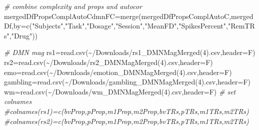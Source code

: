 \documentclass[
]{article}
\newenvironment{Shaded}{\begin{snugshade}}{\end{snugshade}}
\newcommand{\AttributeTok}[1]{\textcolor[rgb]{0.77,0.63,0.00}{#1}}
\newcommand{\CommentTok}[1]{\textcolor[rgb]{0.56,0.35,0.01}{\textit{#1}}}
\newcommand{\FunctionTok}[1]{\textcolor[rgb]{0.00,0.00,0.00}{#1}}
\newcommand{\NormalTok}[1]{#1}
\newcommand{\OtherTok}[1]{\textcolor[rgb]{0.56,0.35,0.01}{#1}}
\newcommand{\StringTok}[1]{\textcolor[rgb]{0.31,0.60,0.02}{#1}}
\begin{document}
\begin{Shaded}
\begin{Highlighting}[]
\CommentTok{\# combine complexity and props and autocor}
\NormalTok{mergedDfPropsComplAutoCdmnFC}\OtherTok{=}\FunctionTok{merge}\NormalTok{(mergedDfPropsComplAutoC,mergedDf,}\AttributeTok{by=}\FunctionTok{c}\NormalTok{(}\StringTok{"Subjects"}\NormalTok{,}\StringTok{"Task"}\NormalTok{,}\StringTok{"Dosage"}\NormalTok{,}\StringTok{"Session"}\NormalTok{,}\StringTok{"MeanFD"}\NormalTok{,}\StringTok{"SpikesPercent"}\NormalTok{,}\StringTok{"RemTRs"}\NormalTok{,}\StringTok{"Drug"}\NormalTok{))}
\end{Highlighting}
\end{Shaded}

\begin{Shaded}
\begin{Highlighting}[]
\CommentTok{\# DMN mag}
\NormalTok{rs1}\OtherTok{=}\FunctionTok{read.csv}\NormalTok{(}\StringTok{\textquotesingle{}\textasciitilde{}/Downloads/rs1\_DMNMagMerged(4).csv\textquotesingle{}}\NormalTok{,}\AttributeTok{header=}\NormalTok{F)}
\NormalTok{rs2}\OtherTok{=}\FunctionTok{read.csv}\NormalTok{(}\StringTok{\textquotesingle{}\textasciitilde{}/Downloads/rs2\_DMNMagMerged(4).csv\textquotesingle{}}\NormalTok{,}\AttributeTok{header=}\NormalTok{F)}
\NormalTok{emo}\OtherTok{=}\FunctionTok{read.csv}\NormalTok{(}\StringTok{\textquotesingle{}\textasciitilde{}/Downloads/emotion\_DMNMagMerged(4).csv\textquotesingle{}}\NormalTok{,}\AttributeTok{header=}\NormalTok{F)}
\NormalTok{gambling}\OtherTok{=}\FunctionTok{read.csv}\NormalTok{(}\StringTok{\textquotesingle{}\textasciitilde{}/Downloads/gambling\_DMNMagMerged(4).csv\textquotesingle{}}\NormalTok{,}\AttributeTok{header=}\NormalTok{F)}
\NormalTok{wm}\OtherTok{=}\FunctionTok{read.csv}\NormalTok{(}\StringTok{\textquotesingle{}\textasciitilde{}/Downloads/wm\_DMNMagMerged(4).csv\textquotesingle{}}\NormalTok{,}\AttributeTok{header=}\NormalTok{F)}
\CommentTok{\# set colnames}
\CommentTok{\#colnames(rs1)=c(\textquotesingle{}bvProp\textquotesingle{},\textquotesingle{}pProp\textquotesingle{},\textquotesingle{}m1Prop\textquotesingle{},\textquotesingle{}m2Prop\textquotesingle{},\textquotesingle{}bvTRs\textquotesingle{},\textquotesingle{}pTRs\textquotesingle{},\textquotesingle{}m1TRs\textquotesingle{},\textquotesingle{}m2TRs\textquotesingle{})}
\CommentTok{\#colnames(rs2)=c(\textquotesingle{}bvProp\textquotesingle{},\textquotesingle{}pProp\textquotesingle{},\textquotesingle{}m1Prop\textquotesingle{},\textquotesingle{}m2Prop\textquotesingle{},\textquotesingle{}bvTRs\textquotesingle{},\textquotesingle{}pTRs\textquotesingle{},\textquotesingle{}m1TRs\textquotesingle{},\textquotesingle{}m2TRs\textquotesingle{})}

\end{Highlighting}
\end{Shaded}
\end{document}
